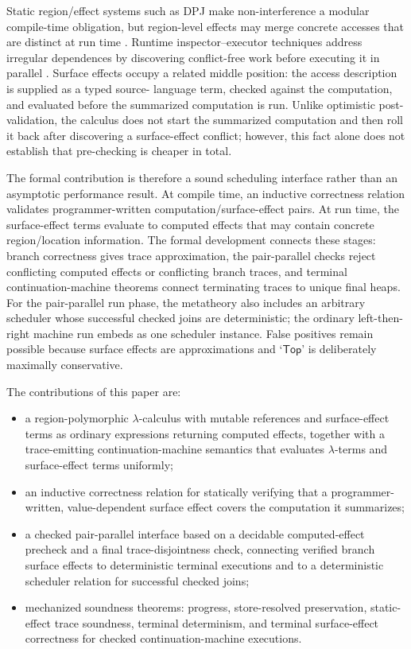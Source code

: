 \documentclass[10pt,a4paper]{article}
\newcommand{\Top}{\mathsf{Top}}
\begin{document}
Static region/effect systems such as DPJ make non-interference a modular
compile-time obligation, but region-level effects may merge concrete accesses
that are distinct at run time \citep{bocchino2009}. Runtime inspector--executor
techniques address irregular dependences by discovering conflict-free work
before executing it in parallel \citep{arenaz2004}. Surface effects occupy a
related middle position: the access description is supplied as a typed source-
language term, checked against the computation, and evaluated before the
summarized computation is run. Unlike optimistic post-validation, the calculus
does not start the summarized computation and then roll it back after discovering
a surface-effect conflict; however, this fact alone does not establish that
pre-checking is cheaper in total.

The formal contribution is therefore a sound scheduling interface rather than
an asymptotic performance result. At compile time, an inductive correctness
relation validates programmer-written computation/surface-effect pairs. At run time,
the surface-effect terms evaluate to computed effects that may contain concrete
region/location information. The formal development connects these stages:
branch correctness gives trace approximation, the pair-parallel checks reject
conflicting computed effects or conflicting branch traces, and terminal
continuation-machine theorems connect terminating traces to unique final heaps.
For the pair-parallel run phase, the metatheory also includes an arbitrary
scheduler whose successful checked joins are deterministic; the
ordinary left-then-right machine run embeds as one scheduler instance.
False positives remain possible because surface effects are approximations and
`$\Top$' is deliberately maximally conservative.

The contributions of this paper are:

\begin{itemize}
  \item a region-polymorphic $\lambda$-calculus with mutable references and
        surface-effect terms as ordinary expressions returning computed effects,
        together with a trace-emitting continuation-machine semantics that
        evaluates $\lambda$-terms and surface-effect terms uniformly;
  \item an inductive correctness relation for statically verifying that a
        programmer-written, value-dependent surface effect covers the computation
        it summarizes;
  \item a checked pair-parallel interface based on a decidable computed-effect
        precheck and a final trace-disjointness check, connecting verified
        branch surface effects to deterministic terminal executions and to a
        deterministic scheduler relation for successful checked joins;
  \item mechanized soundness theorems: progress, store-resolved preservation,
        static-effect trace soundness, terminal determinism, and terminal
        surface-effect correctness for checked continuation-machine executions.
\end{itemize}
\end{document}

